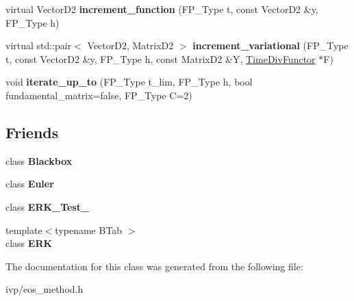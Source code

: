 \begin{DoxyCompactItemize}
virtual Vector\+D2 {\bfseries increment\+\_\+function} (F\+P\+\_\+\+Type t, const Vector\+D2 \&y, F\+P\+\_\+\+Type h)
\item 
\mbox{\label{classOneStepMethod_ae5eff75de4c6a05f94e130e1739b9b21}} 
virtual std\+::pair$<$ Vector\+D2, Matrix\+D2 $>$ {\bfseries increment\+\_\+variational} (F\+P\+\_\+\+Type t, const Vector\+D2 \&y, F\+P\+\_\+\+Type h, const Matrix\+D2 \&Y, \hyperlink{classTimeDivFunctor}{Time\+Div\+Functor} $\ast$F)
\item 
\mbox{\label{classOneStepMethod_aafded57f36af4edf0840cb747dbdc5ea}} 
void {\bfseries iterate\+\_\+up\+\_\+to} (F\+P\+\_\+\+Type t\+\_\+lim, F\+P\+\_\+\+Type h, bool fundamental\+\_\+matrix=false, F\+P\+\_\+\+Type C=2)
\end{DoxyCompactItemize}
\subsection*{Friends}
\begin{DoxyCompactItemize}
\item 
\mbox{\label{classOneStepMethod_af3aa570b8e278b935d7dc84d2774ccb7}} 
class {\bfseries Blackbox}
\item 
\mbox{\label{classOneStepMethod_a9e8c94ebada889fba517c82fc3408d32}} 
class {\bfseries Euler}
\item 
\mbox{\label{classOneStepMethod_a146a867264afb1cda48fa788ceca1f13}} 
class {\bfseries E\+R\+K\+\_\+\+Test\+\_}
\item 
\mbox{\label{classOneStepMethod_a55adbdc4c0fea0e770e4d18b0379d490}} 
{\footnotesize template$<$typename B\+Tab $>$ }\\class {\bfseries E\+RK}
\end{DoxyCompactItemize}


The documentation for this class was generated from the following file\+:\begin{DoxyCompactItemize}
\item 
ivp/eos\+\_\+method.\+h\end{DoxyCompactItemize}
